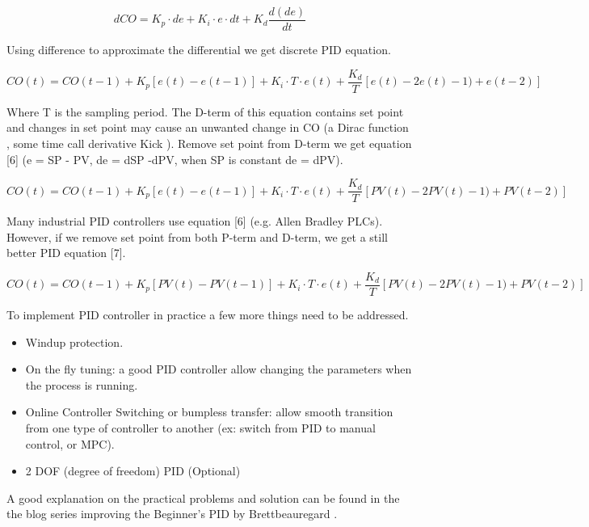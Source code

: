 \begin{equation}
	\label{eqn:5}
	dCO = K_p\cdot de + K_i\cdot e \cdot dt + K_d\frac{d(de)}{dt}
\end{equation}

Using difference to approximate the differential we get discrete PID equation.

\begin{equation}
	\label{eqn:6}
	CO(t) = CO(t-1) + K_p[e(t) - e(t-1)] + K_i\cdot T \cdot e(t) + \frac{K_d}{T}[e(t) - 2e(t)-1) + e(t-2)]
\end{equation}

Where T is the sampling period. The D-term of this equation contains set point and changes in set point may cause an unwanted change in CO (a Dirac function \cite{Delta_Function}, some time call derivative Kick ). Remove set point from D-term we get equation [6] (e = SP - PV, de = dSP -dPV, when SP is constant de = dPV).

\begin{equation}
	\label{eqn:7}
	CO(t) = CO(t-1) + K_p[e(t) - e(t-1)] + K_i\cdot T \cdot e(t) + \frac{K_d}{T}[PV(t) - 2PV(t)-1) + PV(t-2)]
\end{equation}

Many industrial PID controllers use equation [6] (e.g. Allen Bradley PLCs). However, if we remove set point from both P-term and D-term, we get a still better PID equation [7].

\begin{equation}
	\label{eqn:8}
	CO(t) = CO(t-1) + K_p[PV(t) - PV(t-1)] + K_i\cdot T \cdot e(t) + \frac{K_d}{T}[PV(t) - 2PV(t)-1) + PV(t-2)]
\end{equation}

To implement PID controller in practice a few more things need to be addressed.

\begin{itemize}
	\item Windup protection.
	\item On the fly tuning: a good PID controller allow changing the parameters when the process is running.
	\item Online Controller Switching or bumpless transfer:  allow smooth transition from one type of controller to another (ex: switch from PID to manual control, or MPC).
	\item 2 DOF (degree of freedom) PID (Optional) 
\end{itemize}

A good explanation on the practical problems and solution can be found in the the blog series improving the Beginner’s PID by Brettbeauregard \cite{Improving_PID}.

